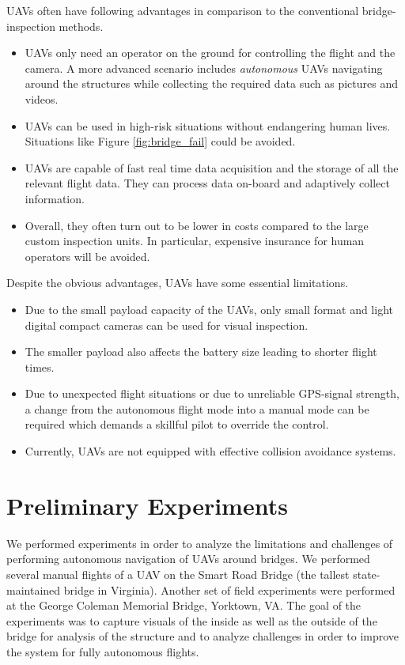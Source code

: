 \documentclass[12pt]{report}
\begin{document}
UAVs often have following advantages in comparison to the conventional bridge-inspection methods.
\begin{itemize}
\item  UAVs only need an operator on the ground for controlling the flight and the
camera. A more advanced scenario includes \textit{autonomous} UAVs navigating around the structures while collecting the required data such as pictures and videos.
\item UAVs can be used in high-risk situations without endangering human lives. Situations like Figure \ref{fig:bridge_fail} could be avoided.
\item UAVs are capable of fast real time data acquisition and the storage of all the relevant flight data. They can process data on-board and adaptively collect information.
\item Overall, they often turn out to be lower in costs compared to the large custom inspection units. In particular, expensive insurance for human operators will be avoided.
\end{itemize}

Despite the obvious advantages, UAVs have some essential limitations. 
\begin{itemize}
\item  Due to the small payload capacity of the UAVs, only small format and light digital compact cameras can be used for visual inspection. 
\item The smaller payload also affects the battery size leading to shorter flight times. 
\item Due to unexpected flight situations or due to unreliable GPS-signal strength, a change from the autonomous flight mode into a manual mode can be required which demands a skillful pilot to override the control.
\item  Currently, UAVs are not equipped with effective collision avoidance systems. 
\end{itemize}

\section{Preliminary Experiments}
We performed experiments in order to analyze the limitations and challenges of performing autonomous navigation of UAVs around bridges. We performed several manual flights of a UAV on the Smart Road Bridge (the tallest state-maintained bridge in Virginia). Another set of field experiments were performed at the George Coleman Memorial Bridge, Yorktown, VA. The goal of the experiments was to capture visuals of the inside as well as the outside of the bridge for analysis of the structure and to analyze challenges in order to improve the system for fully autonomous flights.
\end{document}
